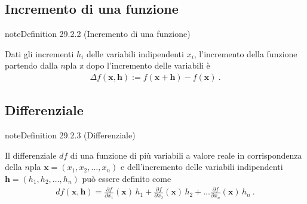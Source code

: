 \documentclass[letterpaper,10pt,italian]{jupyterBook}
\begin{document}
\subsection{Incremento di una funzione}
\label{\detokenize{ch/multivariable-calculus/derivatives:incremento-di-una-funzione}}\label{\detokenize{ch/multivariable-calculus/derivatives:multivariable-calculus-derivatives-increment}}\label{ch/multivariable-calculus/derivatives:definition-2}
\begin{sphinxadmonition}{note}{Definition 29.2.2 (Incremento di una funzione)}



\sphinxAtStartPar
Dati gli incrementi \(h_i\) delle variabili indipendenti \(x_i\), l’incremento della funzione partendo dalla \(n\)\sphinxhyphen{}pla \(\mathbb{x}\) dopo l’incremento delle variabili è
\begin{equation*}
\begin{split}\Delta f(\mathbf{x}, \mathbf{h}) := f(\mathbf{x} + \mathbf{h}) - f(\mathbf{x}) \ .\end{split}
\end{equation*}\end{sphinxadmonition}


\subsection{Differenziale}
\label{\detokenize{ch/multivariable-calculus/derivatives:differenziale}}\label{\detokenize{ch/multivariable-calculus/derivatives:multivariable-calculus-derivatives-differential}}\label{ch/multivariable-calculus/derivatives:definition-3}
\begin{sphinxadmonition}{note}{Definition 29.2.3 (Differenziale)}



\sphinxAtStartPar
Il differenziale \(d f\) di una funzione di più variabili a valore reale in corrispondenza della \(n\)\sphinxhyphen{}pla \(\mathbf{x} = (x_1, x_2, \dots, x_n)\) e dell’incremento delle variabili indipendenti \(\mathbf{h} = (h_1, h_2, \dots, h_n)\) può essere definito come
\begin{equation*}
\begin{split}d f (\mathbf{x}, \mathbf{h}) = \frac{\partial f}{\partial x_1}(\mathbf{x}) \,  h_1 +   
                                 \frac{\partial f}{\partial x_2}(\mathbf{x}) \,  h_2 + \dots
                                 \frac{\partial f}{\partial x_n}(\mathbf{x}) \,  h_n \ .  \end{split}
\end{equation*}\end{sphinxadmonition}
\end{document}
